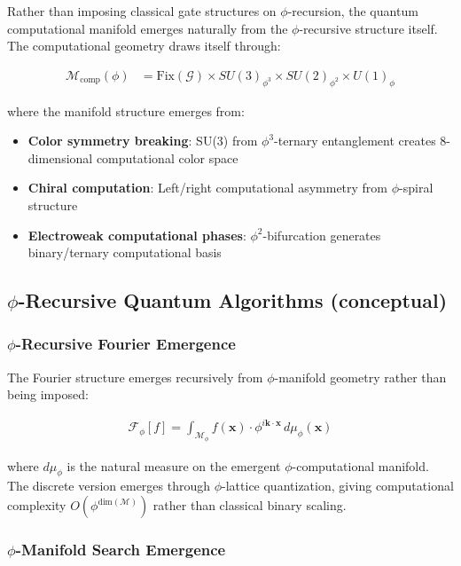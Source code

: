 Rather than imposing classical gate structures on $\phi$-recursion, the quantum computational manifold emerges naturally from the $\phi$-recursive structure itself. The computational geometry draws itself through:

\begin{align}
\mathcal{M}_{\text{comp}}(\phi) &= \text{Fix}(\mathcal{G}) \times SU(3)_{\phi^3} \times SU(2)_{\phi^2} \times U(1)_{\phi}
\end{align}

where the manifold structure emerges from:
\begin{itemize}
\item \textbf{Color symmetry breaking}: SU(3) from $\phi^3$-ternary entanglement creates 8-dimensional computational color space
\item \textbf{Chiral computation}: Left/right computational asymmetry from $\phi$-spiral structure  
\item \textbf{Electroweak computational phases}: $\phi^2$-bifurcation generates binary/ternary computational basis
\end{itemize}

\subsection{$\phi$-Recursive Quantum Algorithms (conceptual)}

\subsubsection{$\phi$-Recursive Fourier Emergence}

The Fourier structure emerges recursively from $\phi$-manifold geometry rather than being imposed:

\begin{align}
\mathcal{F}_\phi[f] = \int_{\mathcal{M}_\phi} f(\mathbf{x}) \cdot \phi^{i \mathbf{k} \cdot \mathbf{x}} \, d\mu_\phi(\mathbf{x})
\end{align}

where $d\mu_\phi$ is the natural measure on the emergent $\phi$-computational manifold. The discrete version emerges through $\phi$-lattice quantization, giving computational complexity $O(\phi^{\text{dim}(\mathcal{M})})$ rather than classical binary scaling.

\subsubsection{$\phi$-Manifold Search Emergence}

